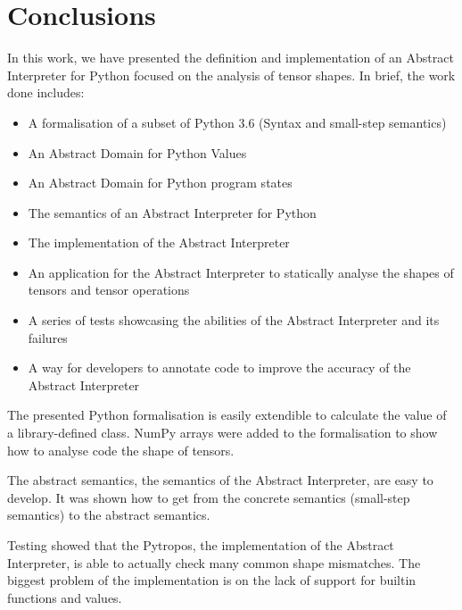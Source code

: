 \chapter{Conclusions}\label{conclusions}

In this work, we have presented the definition and implementation of an Abstract
Interpreter for Python focused on the analysis of tensor shapes. In brief, the work done
includes:

\begin{itemize}
\tightlist
\item A formalisation of a subset of Python 3.6 (Syntax and small-step semantics)
\item An Abstract Domain for Python Values
\item An Abstract Domain for Python program states
\item The semantics of an Abstract Interpreter for Python
\item The implementation of the Abstract Interpreter
\item An application for the Abstract Interpreter to statically analyse the shapes of
  tensors and tensor operations
\item A series of tests showcasing the abilities of the Abstract Interpreter and its
  failures
\item A way for developers to annotate code to improve the accuracy of the Abstract
  Interpreter
\end{itemize}

The presented Python formalisation is easily extendible to calculate the value of a
library-defined class. NumPy arrays were added to the formalisation to show how to analyse
code the shape of tensors.


The abstract semantics, the semantics of the Abstract Interpreter, are easy to develop. It
was shown how to get from the concrete semantics (small-step semantics) to the abstract
semantics.

Testing showed that the Pytropos, the implementation of the Abstract Interpreter, is able
to actually check many common shape mismatches. The biggest problem of the implementation
is on the lack of support for builtin functions and values.

